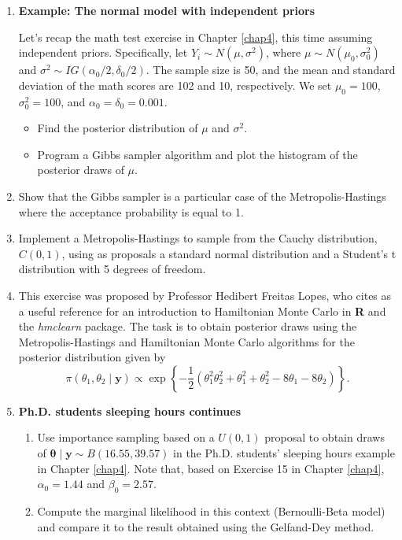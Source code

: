 \begin{enumerate}
	\item \textbf{Example: The normal model with independent priors}
	
	Let's recap the math test exercise in Chapter \ref{chap4}, this time assuming independent priors. Specifically, let $Y_i \sim N(\mu, \sigma^2)$, where $\mu \sim N(\mu_0, \sigma_0^2)$ and $\sigma^2 \sim IG(\alpha_0 / 2, \delta_0 / 2)$. The sample size is 50, and the mean and standard deviation of the math scores are 102 and 10, respectively. We set $\mu_0 = 100$, $\sigma_0^2 = 100$, and $\alpha_0 = \delta_0 = 0.001$.
	
	\begin{itemize}
		\item Find the posterior distribution of $\mu$ and $\sigma^2$.
		\item Program a Gibbs sampler algorithm and plot the histogram of the posterior draws of $\mu$.
	\end{itemize}

	\item Show that the Gibbs sampler is a particular case of the Metropolis-Hastings where the acceptance probability is equal to 1.
	
	\item Implement a Metropolis-Hastings to sample from the Cauchy distribution, $C(0,1)$, using as proposals a standard normal distribution and a Student's t distribution with 5 degrees of freedom.
	
	\item This exercise was proposed by Professor Hedibert Freitas Lopes, who cites \cite{thomas2021learning} as a useful reference for an introduction to Hamiltonian Monte Carlo in \textbf{R} and the \textit{hmclearn} package. The task is to obtain posterior draws using the Metropolis-Hastings and Hamiltonian Monte Carlo algorithms for the posterior distribution given by 
	\[
	\pi(\theta_1,\theta_2\mid \bm{y}) \propto \exp\left\{-\frac{1}{2}(\theta_1^2\theta_2^2 + \theta_1^2 + \theta_2^2 - 8\theta_1 - 8\theta_2)\right\}.
	\]
	
 \item \textbf{Ph.D. students sleeping hours continues}
\begin{enumerate}
	\item Use importance sampling based on a $U(0,1)$ proposal to obtain draws of $\bm{\theta}\mid \bm{y} \sim B(16.55,39.57)$ in the Ph.D. students' sleeping hours example in Chapter \ref{chap4}. Note that, based on Exercise 15 in Chapter \ref{chap4}, $\alpha_0 = 1.44$ and $\beta_0 = 2.57$.
	\item Compute the marginal likelihood in this context (Bernoulli-Beta model) and compare it to the result obtained using the Gelfand-Dey method.
\end{enumerate}


\end{enumerate}
